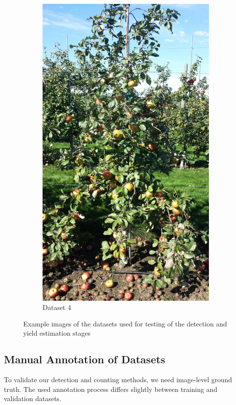 \begin{figure}[ht]
\begin{subfigure}[b]{0.22\textwidth}
        \includegraphics[width=\textwidth]{figures/detection/dataset2.jpg}
        \caption{Dataset 4}
        \label{fig:validd}
    \end{subfigure}
    \caption[Sample images from the test datasets for detection.]{Example images of the datasets used for testing of the detection and yield estimation stages}
    \label{fig:testsets}
\end{figure}


\subsection{Manual Annotation of Datasets}
\label{sec:labeling}
To validate our detection and counting methods, we need image-level ground truth. The used annotation process differs slightly between training and validation datasets. 

